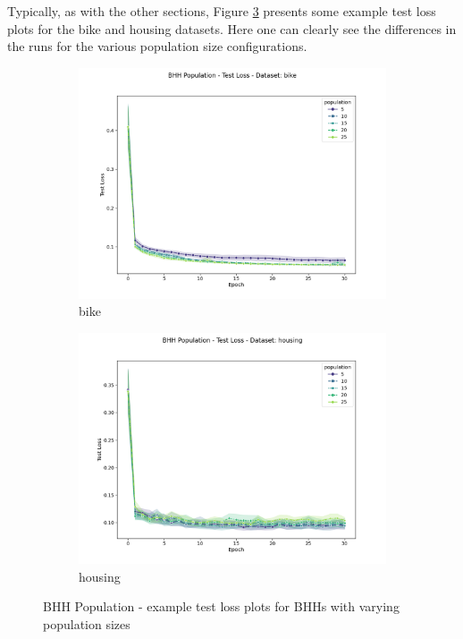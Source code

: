 Typically, as with the other sections, Figure \ref{fig:results:population:figures:loss} presents some example test loss plots for the bike and housing datasets. Here one can clearly see the differences in the runs for the various population size configurations.


\begin{figure}[htbp]
	\begin{subfigure}{0.5\textwidth}
    	\centering
        \includegraphics[width=\textwidth]{analysis/bhh_population/figures/test/loss/bike.png}
        \caption{bike}
        \label{fig:results:population:figures:loss1}
	\end{subfigure}
	\begin{subfigure}{0.5\textwidth}
    	\centering
        \includegraphics[width=\textwidth]{analysis/bhh_population/figures/test/loss/housing.png}
        \caption{housing}
        \label{fig:results:population:figures:loss2}
	\end{subfigure}
	\caption{\Acs{BHH} Population - example test loss plots for \Acsp{BHH} with varying population sizes} 
	\label{fig:results:population:figures:loss}
\end{figure}

